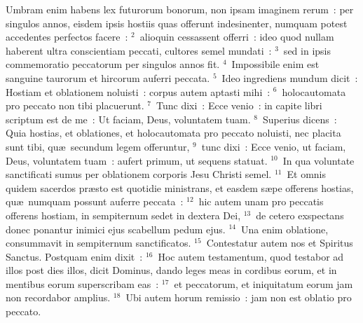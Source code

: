 \lettrine[lines=3,image=true,loversize=0.05,lraise=-0.03]{U}{}mbram enim habens lex futurorum bonorum, non ipsam imaginem rerum~: per singulos annos, eisdem ipsis hostiis quas offerunt indesinenter, numquam potest accedentes perfectos facere~:
${}^{2}$~alioquin cessassent offerri~: ideo quod nullam haberent ultra conscientiam peccati, cultores semel mundati~:
${}^{3}$~sed in ipsis commemoratio peccatorum per singulos annos fit.
${}^{4}$~Impossibile enim est sanguine taurorum et hircorum auferri peccata.
${}^{5}$~Ideo ingrediens mundum dicit~: Hostiam et oblationem noluisti~: corpus autem aptasti mihi~:
${}^{6}$~holocautomata pro peccato non tibi placuerunt.
${}^{7}$~Tunc dixi~: Ecce venio~: in capite libri scriptum est de me~: Ut faciam, Deus, voluntatem tuam.
${}^{8}$~Superius dicens~: Quia hostias, et oblationes, et holocautomata pro peccato noluisti, nec placita sunt tibi, qu\ae\ secundum legem offeruntur,
${}^{9}$~tunc dixi~: Ecce venio, ut faciam, Deus, voluntatem tuam~: aufert primum, ut sequens statuat.
${}^{10}$~In qua voluntate sanctificati sumus per oblationem corporis Jesu Christi semel.
${}^{11}$~Et omnis quidem sacerdos pr\ae sto est quotidie ministrans, et easdem s\ae pe offerens hostias, qu\ae\ numquam possunt auferre peccata~:
${}^{12}$~hic autem unam pro peccatis offerens hostiam, in sempiternum sedet in dextera Dei,
${}^{13}$~de cetero exspectans donec ponantur inimici ejus scabellum pedum ejus.
${}^{14}$~Una enim oblatione, consummavit in sempiternum sanctificatos.
${}^{15}$~Contestatur autem nos et Spiritus Sanctus. Postquam enim dixit~:
${}^{16}$~Hoc autem testamentum, quod testabor ad illos post dies illos, dicit Dominus, dando leges meas in cordibus eorum, et in mentibus eorum superscribam eas~:
${}^{17}$~et peccatorum, et iniquitatum eorum jam non recordabor amplius.
${}^{18}$~Ubi autem horum remissio~: jam non est oblatio pro peccato.


